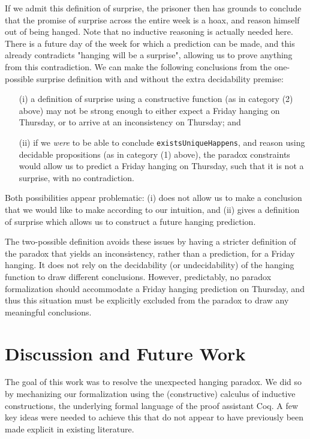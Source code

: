 \documentclass[runningheads]{llncs}
\begin{document}
If we admit this definition of surprise, the prisoner then has grounds to conclude that
the promise of surprise across the entire week is a hoax, and reason himself out of being hanged.
Note that no inductive reasoning is actually needed here. There is a future day
of the week for which a prediction can be made, and this already contradicts
"hanging will be a surprise", allowing us to prove anything from this contradiction.
We can make the following conclusions from the one-possible surprise definition
with and without the extra decidability premise:

\begin{itemize}
  \item[(i)] a definition of surprise using a constructive function (as in category
  (2) above)
  may not be strong enough to either expect
  a Friday hanging on Thursday, or to arrive at an inconsistency
  on Thursday; and \newline

  \item[(ii)] if we \emph{were} to be able to conclude {\tt existsUniqueHappens},
  and reason using decidable propositions (as in category (1) above), the paradox
  constraints would allow us to predict a Friday hanging on Thursday, such
  that it is not a surprise, with no contradiction.
\end{itemize}

Both possibilities appear problematic: (i) does not allow us to make
a conclusion that we would like to make according to our intuition,
and (ii) gives a definition of surprise which allows us to construct a future
hanging prediction.

The two-possible definition avoids these issues by having a stricter definition
of the paradox that yields an inconsistency, rather than a prediction, for a
Friday hanging. It does not rely on the decidability (or undecidability) of the
hanging function to draw different conclusions. However, predictably, no paradox
formalization
should accommodate a Friday hanging prediction on Thursday, and thus this
situation must be explicitly excluded from the paradox to draw any meaningful
conclusions.

\section{Discussion and Future Work}

The goal of this work was to resolve the unexpected hanging paradox. We
did so by mechanizing our formalization
using the (constructive) calculus of inductive constructions, the underlying
formal language of the proof assistant Coq. A few key ideas were needed to
achieve this that do not appear to have previously been made explicit in existing
literature.
\end{document}
